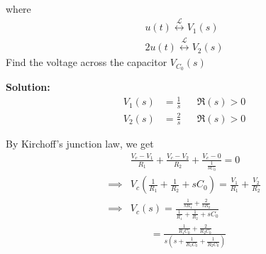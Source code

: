 \documentclass[journal,12pt,twocolumn]{IEEEtran}
\newcommand{\solution}{\noindent \textbf{Solution: }}
\providecommand{\brak}[1]{\ensuremath{\left(#1\right)}}
\providecommand{\system}[1]{\overset{\mathcal{#1}}{ \longleftrightarrow}}
\numberwithin{equation}{section}
\numberwithin{figure}{section}
\renewcommand\thesection{\arabic{section}}
\begin{document}
\begin{enumerate}[label=\thesection.\arabic*.,ref=\thesection.\theenumi]
	where 
	\begin{align}
		u(t) \system{L} V_1(s) \\
		2u(t) \system{L} V_2(s)
	\end{align}
	Find the voltage across the capacitor $V_{C_0}(s)$
	
	\solution 
	\begin{align}
		V_1(s) &= \frac{1}{s} &&\Re(s) > 0 \\
		V_2(s) &= \frac{2}{s} &&\Re(s) > 0 
	\end{align}		
		
	By Kirchoff's junction law, we get
	\begin{align}
		&\frac{V_c - V_1}{R_1} + 	\frac{V_c - V_2}{R_2} + \frac{V_c - 0}{\frac{1}{sC_0}} = 0 \\
		\implies &V_c \brak{\frac{1}{R_1} + \frac{1}{R_2} + sC_0} = \frac{V_1}{R_1} + \frac{V_2}{R_2} \\
		\implies &V_c(s) = \frac{\frac{1}{sR_1} + \frac{2}{sR_2}}{\frac{1}{R_1} + \frac{1}{R_2} + sC_0} \\
		&\qquad = \frac{\frac{1}{R_1C_0} + \frac{2}{R_2C_0}}{s\brak{s + \frac{1}{R_1C_0} + \frac{1}{R_2C_0}}} 
	\end{align}
	
	
	
	
	\end{enumerate}
	
\end{document}
